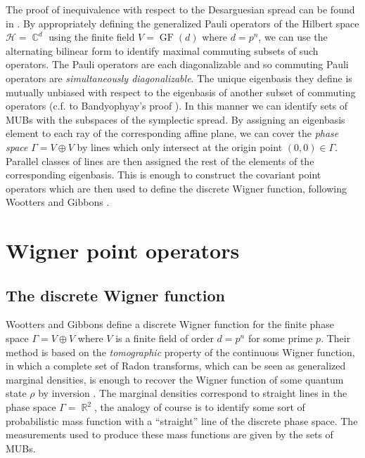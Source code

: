 \documentclass[a4paper, 11pt]{article}
\DeclareMathOperator{\R}{\mathbb{R}}
\DeclareMathOperator{\C}{\mathbb{C}}
\DeclareMathOperator{\GF}{GF}
\begin{document}
  The proof of inequivalence with respect to the
  Desarguesian spread can be found in \cite{bader}. By
  appropriately defining the generalized Pauli operators
  of the Hilbert space $\mathcal H = \C^{d}$ using the
  finite field $V = \GF(d)$ where $d = p^{n}$, we can use
  the alternating bilinear form to identify maximal
  commuting subsets of such operators. The Pauli operators
  are each diagonalizable and so commuting Pauli operators
  are \textit{simultaneously diagonalizable}. The unique
  eigenbasis they define is mutually unbiased with respect
  to the eigenbasis of another subset of commuting operators
  (c.f. to Bandyophyay's proof \cite{bandyopadhyay2001}). In
  this manner we can identify sets of MUBs with the
  subspaces of the symplectic spread. By assigning an
  eigenbasis element to each ray  of the corresponding
  affine plane, we can cover the \textit{phase space}
  $\Gamma = V \oplus V$ by lines which only intersect at the
  origin point $(0,0) \in \Gamma$. Parallel classes of lines
  are then assigned the rest of the elements of the
  corresponding eigenbasis. This is enough to construct the
  covariant point operators which are then used to define
  the discrete Wigner function, following Wootters and
  Gibbons \cite{gibbons2004}.

  \section{Wigner point operators}

  \subsection{The discrete Wigner function}

  Wootters and Gibbons define a discrete Wigner function for
  the finite phase space $\Gamma = V \oplus V$ where $V$ is
  a finite field of order $d = p^{n}$ for some prime $p$.
  Their method is based on the \textit{tomographic} property
  of the continuous Wigner function, in which a complete set
  of Radon transforms, which can be seen as generalized
  marginal densities, is enough to recover the Wigner
  function of some quantum state $\rho$  by inversion
  \cite{gibbons2004}. The marginal densities correspond to
  straight lines in the phase space $\Gamma = \R^2$, the
  analogy of course is to identify some sort of
  probabilistic mass function with a ``straight'' line of
  the discrete phase space. The measurements used to produce
  these mass functions are given by the sets of MUBs.
\end{document}
